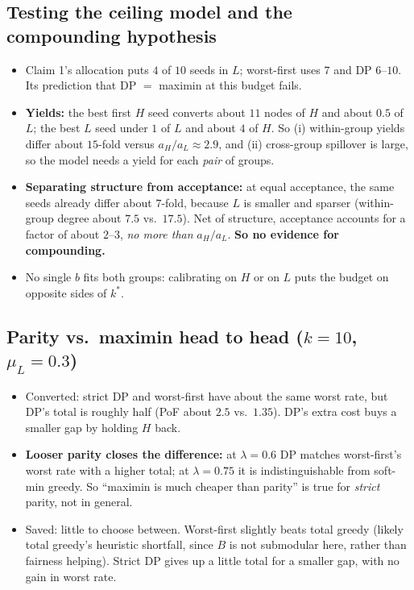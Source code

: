 \documentclass[11pt]{article}
\begin{document}
\subsection{Testing the ceiling model and the compounding hypothesis}
\begin{itemize}
\item Claim 1's allocation puts $4$ of $10$ seeds in $L$; worst-first uses $7$ and DP $6$--$10$. Its prediction that DP $=$ maximin at this budget fails.
\item \textbf{Yields:} the best first $H$ seed converts about $11$ nodes of $H$ and about $0.5$ of $L$; the best $L$ seed under $1$ of $L$ and about $4$ of $H$. So (i) within-group yields differ about $15$-fold versus $a_H/a_L\approx2.9$, and (ii) cross-group spillover is large, so the model needs a yield for each \emph{pair} of groups.
\item \textbf{Separating structure from acceptance:} at equal acceptance, the same seeds already differ about $7$-fold, because $L$ is smaller and sparser (within-group degree about $7.5$ vs.\ $17.5$). Net of structure, acceptance accounts for a factor of about $2$--$3$, \emph{no more than} $a_H/a_L$. \textbf{So no evidence for compounding.}
\item No single $b$ fits both groups: calibrating on $H$ or on $L$ puts the budget on opposite sides of $k^*$.
\end{itemize}

\subsection{Parity vs.\ maximin head to head ($k=10$, $\mu_L=0.3$)}
\begin{itemize}
\item Converted: strict DP and worst-first have about the same worst rate, but DP's total is roughly half (PoF about $2.5$ vs.\ $1.35$). DP's extra cost buys a smaller gap by holding $H$ back.
\item \textbf{Looser parity closes the difference:} at $\lambda=0.6$ DP matches worst-first's worst rate with a higher total; at $\lambda=0.75$ it is indistinguishable from soft-min greedy. So ``maximin is much cheaper than parity'' is true for \emph{strict} parity, not in general.
\item Saved: little to choose between. Worst-first slightly beats total greedy (likely total greedy's heuristic shortfall, since $B$ is not submodular here, rather than fairness helping). Strict DP gives up a little total for a smaller gap, with no gain in worst rate.
\end{itemize}
\end{document}
